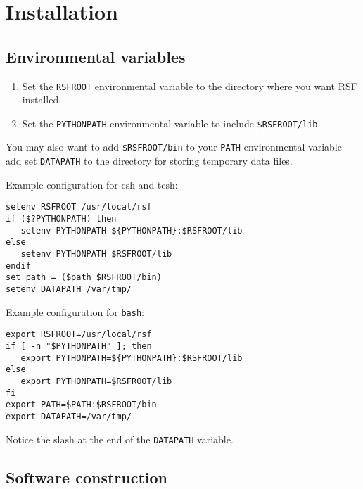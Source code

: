 \section{Installation}

\subsection{Environmental variables}

\begin{enumerate}
\item  Set the \texttt{RSFROOT} environmental variable to the directory where you want RSF installed.
\item Set the \texttt{PYTHONPATH} environmental variable to include \texttt{\$RSFROOT/lib}. 
\end{enumerate}

You may also want to add \texttt{\$RSFROOT/bin} to your \texttt{PATH}
environmental variable add set \texttt{DATAPATH} to the directory for
storing temporary data files. 

Example configuration for csh and tcsh:
\begin{verbatim}
setenv RSFROOT /usr/local/rsf
if ($?PYTHONPATH) then
   setenv PYTHONPATH ${PYTHONPATH}:$RSFROOT/lib
else
   setenv PYTHONPATH $RSFROOT/lib
endif
set path = ($path $RSFROOT/bin)
setenv DATAPATH /var/tmp/
\end{verbatim}

Example configuration for \texttt{bash}:
\begin{verbatim}
export RSFROOT=/usr/local/rsf
if [ -n "$PYTHONPATH" ]; then
   export PYTHONPATH=${PYTHONPATH}:$RSFROOT/lib
else
   export PYTHONPATH=$RSFROOT/lib
fi
export PATH=$PATH:$RSFROOT/bin
export DATAPATH=/var/tmp/
\end{verbatim}

Notice the slash at the end of the \texttt{DATAPATH} variable.

\subsection{Software construction}

